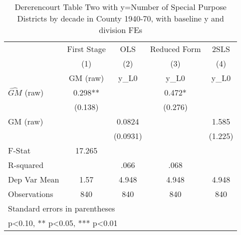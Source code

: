 \begin{table}[htbp]\centering
\def\sym#1{\ifmmode^{#1}\else\(^{#1}\)\fi}
\caption{Dererencourt Table Two with y=Number of Special Purpose Districts by decade in County 1940-70, with baseline y and division FEs}
\begin{tabular}{l*{4}{c}}
\toprule
                    & First Stage   &         OLS   &Reduced Form   &        2SLS   \\
                    &\multicolumn{1}{c}{(1)}&\multicolumn{1}{c}{(2)}&\multicolumn{1}{c}{(3)}&\multicolumn{1}{c}{(4)}\\
                    &\multicolumn{1}{c}{GM  (raw)}&\multicolumn{1}{c}{y\_L0}&\multicolumn{1}{c}{y\_L0}&\multicolumn{1}{c}{y\_L0}\\
\midrule
$\hat{GM}$ (raw)    &       0.298** &               &       0.472*  &               \\
                    &     (0.138)   &               &     (0.276)   &               \\
\addlinespace
GM  (raw)           &               &      0.0824   &               &       1.585   \\
                    &               &    (0.0931)   &               &     (1.225)   \\
\midrule
F-Stat              &      17.265   &               &               &               \\
R-squared           &               &        .066   &        .068   &               \\
Dep Var Mean        &        1.57   &       4.948   &       4.948   &       4.948   \\
Observations        &         840   &         840   &         840   &         840   \\
\bottomrule
\multicolumn{5}{l}{\footnotesize Standard errors in parentheses}\\
\multicolumn{5}{l}{\footnotesize * p<0.10, ** p<0.05, *** p<0.01}\\
\end{tabular}
\end{table}
